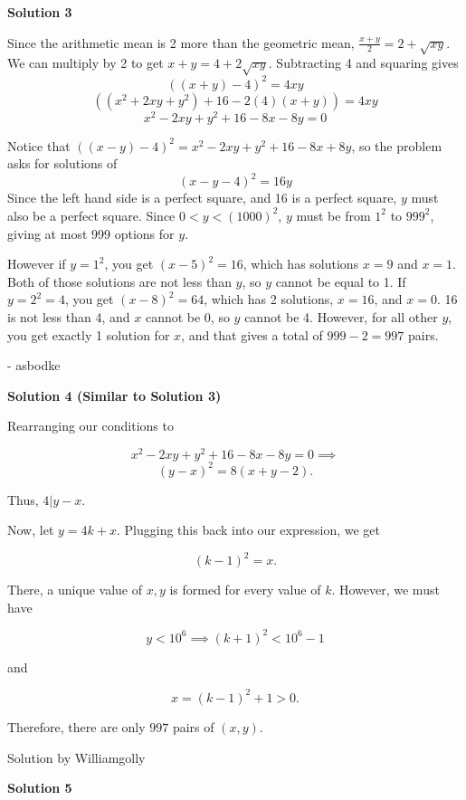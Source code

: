 \begin{enumerate}
 



\textbf{Solution 3}

Since the arithmetic mean is 2 more than the geometric mean, $\frac{x+y}{2} = 2 + \sqrt{xy}$. We can multiply by 2 to get $x + y = 4 + 2\sqrt{xy}$. Subtracting 4 and squaring gives 
 \[((x+y)-4)^2 = 4xy\]
 \[((x^2 + 2xy + y^2) + 16 - 2(4)(x+y)) = 4xy\]
 \[x^2 - 2xy + y^2 + 16 - 8x - 8y = 0\]

 Notice that $((x-y)-4)^2 = x^2 - 2xy + y^2 + 16 - 8x +8y$, so the problem asks for solutions of 
 \[(x-y-4)^2 = 16y\]Since the left hand side is a perfect square, and 16 is a perfect square, $y$ must also be a perfect square. Since $0 < y < (1000)^2$, $y$ must be from $1^2$ to $999^2$, giving at most 999 options for $y$.

 However if $y = 1^2$, you get $(x-5)^2 = 16$, which has solutions $x = 9$ and $x = 1$. Both of those solutions are not less than $y$, so $y$ cannot be equal to 1. If $y = 2^2 = 4$, you get $(x - 8)^2 = 64$, which has 2 solutions, $x = 16$, and $x = 0$. 16 is not less than 4, and $x$ cannot be 0, so $y$ cannot be 4. However, for all other $y$, you get exactly 1 solution for $x$, and that gives a total of $999 - 2 = \boxed{997}$ pairs.

 - asbodke

 


 



\textbf{Solution 4 (Similar to Solution 3)}

Rearranging our conditions to 

 
 \[x^2-2xy+y^2+16-8x-8y=0 \implies\]
 \[(y-x)^2=8(x+y-2).\]

 Thus, $4|y-x.$

 Now, let $y = 4k+x.$ Plugging this back into our expression, we get

 
 \[(k-1)^2=x.\]

 There, a unique value of $x, y$ is formed for every value of $k$. However, we must have 

 
 \[y<10^6 \implies (k+1)^2< 10^6-1\]

 and 

 
 \[x=(k-1)^2+1>0.\]

 Therefore, there are only $\boxed{997}$ pairs of $(x,y).$

 Solution by Williamgolly

 



\textbf{Solution 5}


\end{enumerate}
